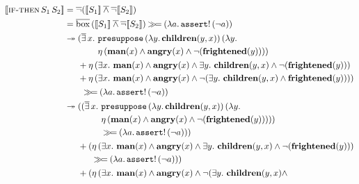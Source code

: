 \begin{align*}
  \sem{\app{\abs{if-then}}{S_1}{S_2}}
  &= \dnot (\sem{S_1} \dand \dnot \sem{S_2}) \\
  &= \ap{\DBOX}{(\sem{S_1} \dand \dnot \sem{S_2})} \hsbind (\lam{a}{\ap{\op{assert}!}{(\lnot a)}}) \\
  &\tto \begin{aligned}[t]
    &(\dexists x.\ \begin{aligned}[t]
         &\app{\op{presuppose}}{(\lam{y}{\obj{children}(y, x)})}{(\lam{y}{ \\
         &\etaE{(\obj{man}(x) \land \obj{angry}(x) \land \lnot (\obj{frightened}(y)))}})}
       \end{aligned} \\
    &+ \etaE{(\exists x.\ \obj{man}(x) \land \obj{angry}(x) \land
              \exists y.\ \obj{children}(y, x) \land
              \lnot (\obj{frightened}(y)))} \\
    &+ \etaE{(\exists x.\ \obj{man}(x) \land \obj{angry}(x) \land
              \lnot (\exists y.\ \obj{children}(y, x) \land
              \obj{frightened}(y)))})
    \end{aligned} \\
  &\qquad \hsbind (\lam{a}{\ap{\op{assert}!}{(\lnot a)}}) \\
  &\tto \begin{aligned}[t]
     &((\dexists x.\ \begin{aligned}[t]
         &\app{\op{presuppose}}{(\lam{y}{\obj{children}(y, x)})}{(\lam{y}{ \\
         &\etaE{(\obj{man}(x) \land \obj{angry}(x) \land \lnot (\obj{frightened}(y)))}})}) \\
         &\hsbind (\lam{a}{\ap{\op{assert}!}{(\lnot a)}})) \\
       \end{aligned} \\
     &+ (\begin{aligned}[t]
           &\etaE{(\exists x.\ \obj{man}(x) \land \obj{angry}(x) \land
                   \exists y.\ \obj{children}(y, x) \land
                   \lnot (\obj{frightened}(y)))} \\
           &\hsbind (\lam{a}{\ap{\op{assert}!}{(\lnot a)}}))
         \end{aligned} \\
     &+ (\begin{aligned}[t]
           &\etaE{(\exists x.\ \obj{man}(x) \land \obj{angry}(x) \land
                  \lnot (\exists y.\ \obj{children}(y, x) \land
}
\end{aligned}
\end{aligned}
\end{align*}
